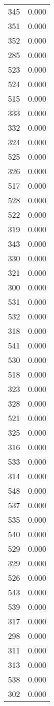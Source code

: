 \begin{table}
\begin{tabular}{lr}
345 & 0.000 \\
351 & 0.000 \\
352 & 0.000 \\
285 & 0.000 \\
523 & 0.000 \\
524 & 0.000 \\
515 & 0.000 \\
333 & 0.000 \\
332 & 0.000 \\
324 & 0.000 \\
525 & 0.000 \\
326 & 0.000 \\
517 & 0.000 \\
528 & 0.000 \\
522 & 0.000 \\
319 & 0.000 \\
343 & 0.000 \\
330 & 0.000 \\
321 & 0.000 \\
300 & 0.000 \\
531 & 0.000 \\
532 & 0.000 \\
318 & 0.000 \\
541 & 0.000 \\
530 & 0.000 \\
518 & 0.000 \\
323 & 0.000 \\
328 & 0.000 \\
521 & 0.000 \\
325 & 0.000 \\
316 & 0.000 \\
533 & 0.000 \\
314 & 0.000 \\
548 & 0.000 \\
537 & 0.000 \\
535 & 0.000 \\
540 & 0.000 \\
529 & 0.000 \\
329 & 0.000 \\
526 & 0.000 \\
543 & 0.000 \\
539 & 0.000 \\
317 & 0.000 \\
298 & 0.000 \\
311 & 0.000 \\
313 & 0.000 \\
538 & 0.000 \\
302 & 0.000 \\

\end{tabular}
\end{table}
